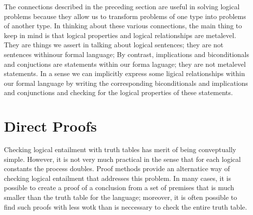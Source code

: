 \documentclass[10pt,a4pape,twocolumn]{article}
\begin{document}
                The connections described in the preceding section are useful in solving logical problems because they allow us to transform problems of one type into problems of another type. In thinking about these various connections, the main thing to keep in mind is that logical properties and logical relationships are metalevel. They are things we assert in talking about logical sentences; they are not sentences withinour formal language; By contrast, implications and biconditionals and conjuctions are statements within our forma laguage; they are not metalevel statements. In a sense we can implicitly express some ligical relationships within our formal language by writing the corresponding biconditionals and implications and conjunctions and checking for the logical properties of these statements. 
        \section{Direct Proofs}
            Checking logical entailment with truth tables has merit of being conveptually simple. However, it is not very much practical in the sense that for each logical constants the process doubles. Proof methods provide an alternatice way of checking logical entailment that addresses this problem. In many cases, it is possible to create a proof of a conclusion from a set of premises that is much smaller than the truth table for the language; moreover, it is often possible to find such proofs with less wotk than is neccessary to check the entire truth table.
            \\
            \\
\end{document}

